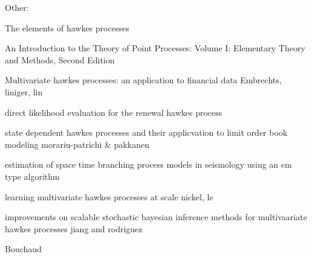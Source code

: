 \documentclass[honours,12pt]{unswthesis}
\newcommand{\CC}{\mathcal{C}}
\numberwithin{equation}{section}
\begin{document}
\begin{thebibliography}{999}
%
%
%
%
%
%
%
%
%
%
%


Other:

The elements of hawkes processes

An Introduction to the Theory of Point Processes: Volume I: Elementary Theory and Methods, Second Edition

Multivariate hawkes processes: an application to financial data
Embrechts, liniger, lin

direct likelihood evaluation for the renewal hawkes process

state dependent hawkes processes and their applicvation to limit order book modeling
morariu-patrichi \& pakkanen

estimation of space time branching process models in seismology using an em type algorithm

learning multivariate hawkes processes at scale
nickel, le

improvements on scalable stochastic bayesian inference methods for multivaariate hawkes processes
jiang and rodriguez

Bouchaud

\end{thebibliography}
\end{document}
